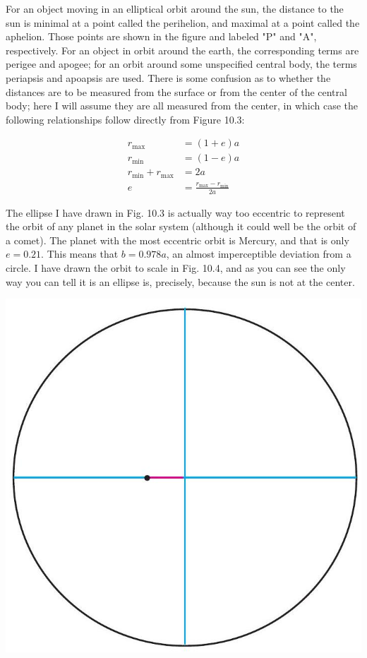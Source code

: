 \documentclass[10pt]{article}
\begin{document}
For an object moving in an elliptical orbit around the sun, the distance to the sun is minimal at a point called the perihelion, and maximal at a point called the aphelion. Those points are shown in the figure and labeled "P" and "A", respectively. For an object in orbit around the earth, the corresponding terms are perigee and apogee; for an orbit around some unspecified central body, the terms periapsis and apoapsis are used. There is some confusion as to whether the distances are to be measured from the surface or from the center of the central body; here I will assume they are all measured from the center, in which case the following relationships follow directly from Figure 10.3:


\begin{align*}
r_{\max } & =(1+e) a \\
r_{\min } & =(1-e) a \\
r_{\min }+r_{\max } & =2 a \\
e & =\frac{r_{\max }-r_{\min }}{2 a} \tag{10.12}
\end{align*}


The ellipse I have drawn in Fig. 10.3 is actually way too eccentric to represent the orbit of any planet in the solar system (although it could well be the orbit of a comet). The planet with the most eccentric orbit is Mercury, and that is only $e=0.21$. This means that $b=0.978 a$, an almost imperceptible deviation from a circle. I have drawn the orbit to scale in Fig. 10.4, and as you can see the only way you can tell it is an ellipse is, precisely, because the sun is not at the center.

\begin{center}
\includegraphics[max width=\textwidth]{2024_09_14_9969b06773f10b6936e8g-247}
\end{center}
\end{document}
